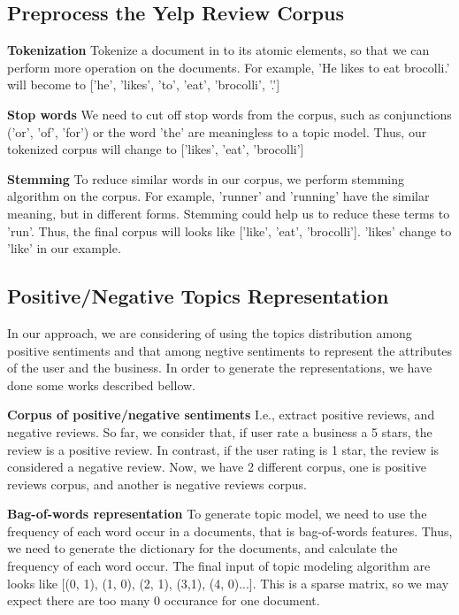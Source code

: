 \documentclass[10pt,twocolumn,letterpaper]{article}
\begin{document}
\subsection{Preprocess the Yelp Review Corpus}

\textbf{Tokenization} Tokenize a document in to its atomic elements, so that we can perform more operation on the documents. For example, 'He likes to eat brocolli.' will become to ['he', 'likes', 'to', 'eat', 'brocolli', '.']

\textbf{Stop words} We need to cut off stop words from the corpus, such as conjunctions ('or', 'of', 'for') or the word 'the' are meaningless to a topic model. Thus, our tokenized corpus will change to ['likes', 'eat', 'brocolli']

\textbf{Stemming} To reduce similar words in our corpus, we perform stemming algorithm on the corpus. For example, 'runner' and 'running' have the similar meaning, but in different forms. Stemming could help us to reduce these terms to 'run'. Thus, the final corpus will looks like ['like', 'eat', 'brocolli']. 'likes' change to 'like' in our example.

\subsection{Positive/Negative Topics Representation}

In our approach, we are considering of using the topics distribution among positive sentiments and that among negtive sentiments to represent the attributes of the user and the business. In order to generate the representations, we have done some works described bellow.

\textbf{Corpus of positive/negative sentiments} I.e., extract positive reviews, and negative reviews. So far, we consider that, if user rate a business a 5 stars, the review is a positive review. In contrast, if the user rating is 1 star, the review is considered a negative review. Now, we have 2 different corpus, one is positive reviews corpus, and another is negative reviews corpus.

\textbf{Bag-of-words representation} To generate topic model, we need to use the frequency of each word occur in a documents, that is bag-of-words features. Thus, we need to generate the dictionary for the documents, and calculate the frequency of each word occur. The final input of topic modeling algorithm are looks like [(0, 1), (1, 0), (2, 1), (3,1), (4, 0)...]. This is a sparse matrix, so we may expect there are too many 0 occurance for one document.
\end{document}
